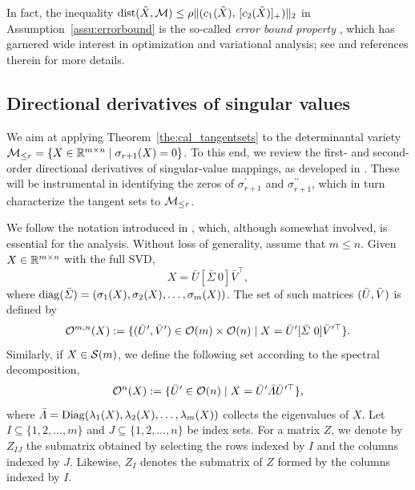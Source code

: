 \begin{remark}
    In fact, the inequality $\operatorname{dist}(\tilde{X},\mathcal{M})\le\rho\|(c_1(\tilde{X}),\,[c_2(\tilde{X})]_+)\|_2$ in Assumption~\ref{assu:errorbound} is the so-called \emph{error bound property} \cite{luo1993errorbound,luo1994errorboundapplication}, which has garnered wide interest in optimization and variational analysis; see \cite{luo1993errorbound,luo1994errorboundapplication,aze2003errorboundsurvey} and references therein for more details.
\end{remark}



\subsection{Directional derivatives of singular values}\label{sec:directionalderisigma}
We aim at applying Theorem~\ref{the:cal_tangentsets} to the determinantal variety $\mathcal{M}_{\le r}=\{X\in\mathbb{R}^{m\times n}\mid\sigma_{r+1}(X)=0\}$. To this end, we review the first- and second-order directional derivatives of singular-value mappings, as developed in \cite{lewis2005nonsmoothPartI,zhang2013secondordersingular,ding2014introductiontomatrixCP}. These will be instrumental in identifying the zeros of $\sigma_{r+1}^\prime$ and $\sigma_{r+1}^{\prime\prime}$, which in turn characterize the tangent sets to $\mathcal{M}_{\le r}$.

We follow the notation introduced in \cite{zhang2013secondordersingular}, which, although somewhat involved, is essential for the analysis. Without loss of generality, assume that $m\le n$. Given $X\in\mathbb{R}^{m\times n}$ with the full SVD,
\begin{equation}\label{eq:fullSVD}
    X=\bar{U}[\bar{\varSigma}\ 0]\bar{V}^\top,
\end{equation}
where $\operatorname{diag}(\bar{\varSigma})=(\sigma_1(X),\sigma_2(X),\ldots,\sigma_m(X))$. The set of such matrices $(\bar{U},\bar{V})$ is defined by
\begin{equation*}
    \orth^{m,n}(X):=\{(\bU^\prime,\bV^\prime)\in\orth(m)\times \orth(n)\mid X=\bU^\prime[\bar{\varSigma}\ 0]\bV^{\prime\top}\}.
\end{equation*}
Similarly, if $X \in \mathcal{S}(m)$, we define the following set according to the spectral decomposition,
\begin{equation*}
    \mathcal{O}^{n}(X):=\{\bar{U}^\prime\in \mathcal{O}(n)\mid X=\bar{U}^\prime \bar{\varLambda} \bar{U}^{\prime\top}\},
\end{equation*}
where $\bar{\varLambda}=\operatorname{Diag}(\lambda_1(X),\lambda_2(X),\ldots,\lambda_m(X))$ collects the eigenvalues of $X$. Let $I \subseteq \{1,2,\ldots,m\}$ and $J \subseteq \{1,2,\ldots,n\}$ be index sets. For a matrix $Z$, we denote by $Z_{IJ}$ the submatrix obtained by selecting
the rows indexed by $I$ and the columns indexed by $J$.
Likewise, $Z_{I}$ denotes the submatrix of $Z$ formed by the columns indexed by $I$.

